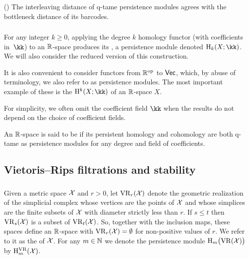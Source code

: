 \proposition (\cite[Thm.~5.14]{Chazal.2016a})
The interleaving distance of q-tame persistence modules agrees with the bottleneck distance of its barcodes.

\subsubsection{}

For any integer $k \geq 0$, applying the degree $k$ homology functor (with coefficients in~$\kk$) to an $\R$-space produces its , a persistence module denoted $\rH_k(X; \kk)$.
We will also consider the reduced version of this construction.

It is also convenient to consider functors from $\R^\op$ to $\Vec$, which, by abuse of terminology, we also refer to as persistence modules.
The most important example of these is the  $\rH^k(X; \kk)$ of an $\R$-space $X$.

For simplicity, we often omit the coefficient field $\kk$ when the results do not depend on the choice of coefficient fields.

An $\R$-space is said to be  if its persistent homology and cohomology are both q-tame as persistence modules for any degree and field of coefficients.

\subsection{Vietoris--Rips filtrations and stability}

\subsubsection{}

Given a metric space $\cX$ and $r > 0$, let $\VR_r(\cX)$ denote the geometric realization of the simplicial complex whose vertices are the points of $\cX$ and whose simplices are the finite subsets of $\cX$ with diameter strictly less than $r$.
If $s \leq t$ then $\VR_s(\cX)$ is a subset of $\VR_t(\cX)$.
So, together with the inclusion maps, these spaces define an $\R$-space with $\VR_r(\cX) = \emptyset$ for non-positive values of $r$.
We refer to it as the  of $\cX$.
For any \(m \in \N\) we denote the persistence module \(\rH_m\big(\VR(\cX)\big)\) by \(\rH_m^{\VR}(\cX)\).

\subsubsection{}\label{sss:q-tameness}

